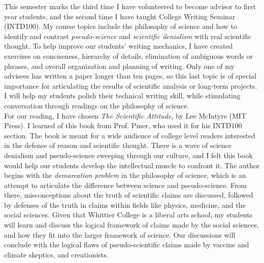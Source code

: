 \documentclass[../../../main.tex]{subfiles}
\begin{document}
\label{sec:first_year}

This semester marks the third time I have volunteered to become advisor to first year students, and the second time I have taught College Writing Seminar (INTD100).  My course topics include the philosophy of science and how to identify and contrast \textit{pseudo-science} and \textit{scientific denialism} with real scientific thought.  To help improve our students' writing mechanics, I have created exercises on conciseness, hierarchy of details, elimination of ambiguous words or phrases, and overall organization and planning of writing.  Only one of my advisees has written a paper longer than ten pages, so this last topic is of special importance for articulating the results of scientific analysis or long-term projects.  I will help my students polish their technical writing skill, while stimulating conversation through readings on the philosophy of science.
\\
\vspace{0.15cm}
For our reading, I have chosen \textit{The Scientific Attitude}, by Lee McIntyre (MIT Press).  I learned of this book from Prof. Piner, who used it for his INTD100 section.  The book is meant for a wide audience of college level readers interested in the defense of reason and scientific thought.  There is a wave of science denialism and pseudo-science sweeping through our culture, and I felt this book would help our students develop the intellectual muscle to confront it.  The author begins with the \textit{demarcation problem} in the philosophy of science, which is an attempt to articulate the difference between science and pseudo-science.  From there, misconceptions about the truth of scientific claims are discussed, followed by defenses of the truth in claims within fields like physics, medicine, and the social sciences.  Given that Whittier College is a liberal arts school, my students will learn and discuss the logical framework of claims made by the social sciences, and how they fit into the larger framework of science.  Our discussions will conclude with the logical flaws of pseudo-scientific claims made by vaccine and climate skeptics, and creationists.
\end{document}
